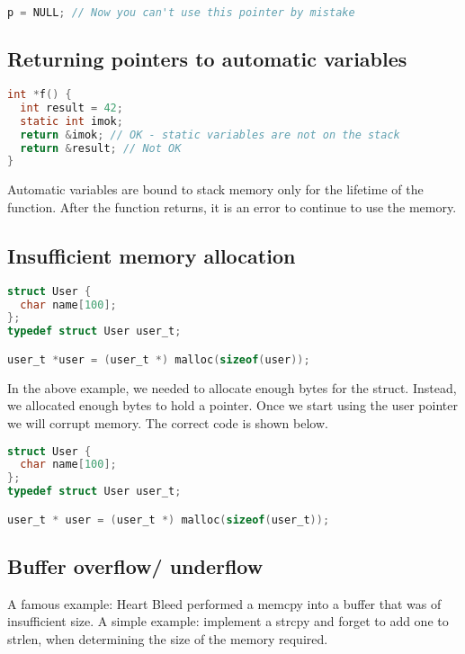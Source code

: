 \begin{lstlisting}[language=C]
p = NULL; // Now you can't use this pointer by mistake
\end{lstlisting}

\subsection{Returning pointers to automatic variables}

\begin{lstlisting}[language=C]
int *f() {
  int result = 42;
  static int imok;
  return &imok; // OK - static variables are not on the stack
  return &result; // Not OK
}
\end{lstlisting}

Automatic variables are bound to stack memory only for the lifetime of the function.
After the function returns, it is an error to continue to use the memory.

\subsection{Insufficient memory allocation}

\begin{lstlisting}[language=C]
struct User {
  char name[100];
};
typedef struct User user_t;

user_t *user = (user_t *) malloc(sizeof(user));
\end{lstlisting}

In the above example, we needed to allocate enough bytes for the struct.
Instead, we allocated enough bytes to hold a pointer.
Once we start using the user pointer we will corrupt memory.
The correct code is shown below.

\begin{lstlisting}[language=C]
struct User {
  char name[100];
};
typedef struct User user_t;

user_t * user = (user_t *) malloc(sizeof(user_t));
\end{lstlisting}

\subsection{Buffer overflow/ underflow}

A famous example: Heart Bleed performed a memcpy into a buffer that was of insufficient size.
A simple example: implement a strcpy and forget to add one to strlen, when determining the size of the memory required.

